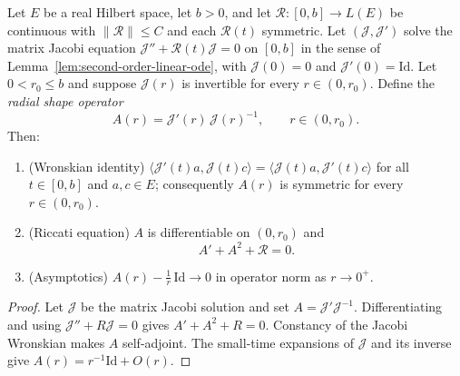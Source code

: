 \begin{lemma}
\label{lem:radial-shape-riccati}





Let $E$ be a real Hilbert space, let $b>0$, and let
$\mathcal R\colon[0,b]\to L(E)$ be continuous with
$\|\mathcal R\|\le C$ and each $\mathcal R(t)$ symmetric. Let
$({\mathcal J},{\mathcal J}')$ solve the matrix Jacobi equation
${\mathcal J}''+{\mathcal R}(t){\mathcal J}=0$ on $[0,b]$ in the sense
of Lemma~\ref{lem:second-order-linear-ode}, with ${\mathcal J}(0)=0$
and ${\mathcal J}'(0)=\mathrm{Id}$. Let $0<r_0\le b$ and suppose
${\mathcal J}(r)$ is invertible for every $r\in(0,r_0)$. Define the
\emph{radial shape operator}
$$A(r)={\mathcal J}'(r)\,{\mathcal J}(r)^{-1},\qquad r\in(0,r_0).$$
Then:
\begin{enumerate}
\item (Wronskian identity) $\langle{\mathcal J}'(t)a,{\mathcal
J}(t)c\rangle=\langle{\mathcal J}(t)a,{\mathcal J}'(t)c\rangle$ for all
$t\in[0,b]$ and $a,c\in E$; consequently $A(r)$ is symmetric for every
$r\in(0,r_0)$.
\item (Riccati equation) $A$ is differentiable on $(0,r_0)$ and
$$A'+A^2+{\mathcal R}=0 .$$
\item (Asymptotics) $A(r)-\tfrac1r\,\mathrm{Id}\to0$ in operator norm
as $r\to0^+$.
\end{enumerate}
\end{lemma}

\begin{proof}
\sketch
{}

Let $\mathcal J$ be the matrix Jacobi solution and set $A=\mathcal J'\mathcal J^{-1}$. Differentiating and using $\mathcal J''+R\mathcal J=0$ gives $A'+A^2+R=0$. Constancy of the Jacobi Wronskian makes $A$ self-adjoint. The small-time expansions of $\mathcal J$ and its inverse give $A(r)=r^{-1}\mathrm{Id}+O(r)$.
\end{proof}

